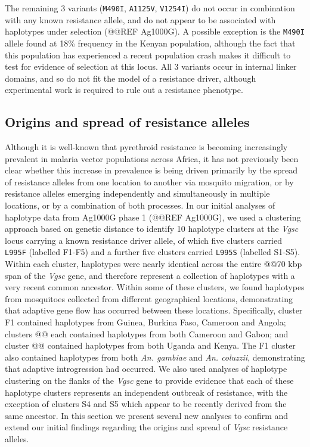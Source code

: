 \documentclass[a4paper,11pt,abstracton]{scrartcl}
\begin{document}
The remaining 3 variants (\texttt{M490I}, \texttt{A1125V}, \texttt{V1254I}) do not occur in combination with any known resistance allele, and do not appear to be associated with haplotypes under selection (@@REF Ag1000G).
%
A possible exception is the \texttt{M490I} allele found at 18\% frequency in the Kenyan population, although the fact that this population has experienced a recent population crash makes it difficult to test for evidence of selection at this locus.
%
All 3 variants occur in internal linker domains, and so do not fit the model of a resistance driver, although experimental work is required to rule out a resistance phenotype.
%


\subsection*{Origins and spread of resistance alleles}


Although it is well-known that pyrethroid resistance is becoming increasingly prevalent in malaria vector populations across Africa, it has not previously been clear whether this increase in prevalence is being driven primarily by the spread of resistance alleles from one location to another via mosquito migration, or by resistance alleles emerging independently and simultaneously in multiple locations, or by a combination of both processes.
%
In our initial analyses of haplotype data from Ag1000G phase 1 (@@REF Ag1000G), we used a clustering approach based on genetic distance to identify 10 haplotype clusters at the \textit{Vgsc} locus carrying a known resistance driver allele, of which five clusters carried \texttt{L995F} (labelled F1-F5) and a further five clusters carried \texttt{L995S} (labelled S1-S5).
%
Within each cluster, haplotypes were nearly identical across the entire @@70 kbp span of the \textit{Vgsc} gene, and therefore represent a collection of haplotypes with a very recent common ancestor.
%
Within some of these clusters, we found haplotypes from mosquitoes collected from different geographical locations, demonstrating that adaptive gene flow has occurred between these locations.
%
Specifically, cluster F1 contained haplotypes from Guinea, Burkina Faso, Cameroon and Angola; clusters @@ each contained haplotypes from both Cameroon and Gabon; and cluster @@ contained haplotypes from both Uganda and Kenya.
%
The F1 cluster also contained haplotypes from both \textit{An. gambiae} and \textit{An. coluzzii}, demonstrating that adaptive introgression had occurred.
%
We also used analyses of haplotype clustering on the flanks of the \textit{Vgsc} gene to provide evidence that each of these haplotype clusters represents an independent outbreak of resistance, with the exception of clusters S4 and S5 which appear to be recently derived from the same ancestor.
%
In this section we present several new analyses to confirm and extend our initial findings regarding the origins and spread of \textit{Vgsc} resistance alleles.
\end{document}
